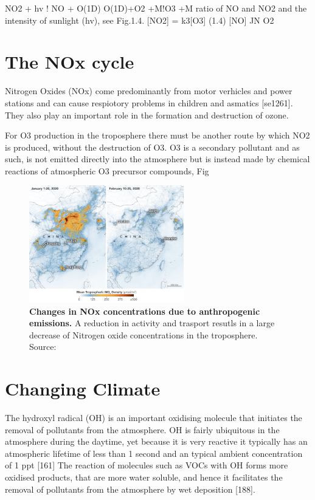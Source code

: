 NO2 + hv   ! NO + O(1D) O(1D)+O2 +M  !O3 +M
ratio of NO and NO2 and the intensity of sunlight (hv), see Fig.1.4.
[NO2] = k3[O3] (1.4)
[NO] JN O2

\section{The NOx cycle}
Nitrogen Oxides (NOx) come predominantly from motor verhicles and power stations and can cause respiotory problems in children and asmatics [se1261]. They also play an important role in the formation and destruction of ozone.



For O3 production in the troposphere there must be another route by which NO2 is produced, without the destruction of O3. O3 is a secondary pollutant and as such, is not emitted directly into the atmosphere but is instead made by chemical reactions of atmospheric O3 precursor compounds, Fig



\begin{figure}[H]
    \centering
    \includegraphics[width=0.6\textwidth]{china_trop_2020056.png}
    \caption{\textbf{Changes in NOx concentrations due to anthropogenic emissions.} A reduction in activity and trasport resutls in a large decrease of Nitrogen oxide concentrations in the troposphere. Source: \citep{chinanox}}
    \label{fig:chinanox}
\end{figure}


\section{Changing Climate}


The hydroxyl radical (OH) is an important oxidising molecule that initiates the removal of pollutants from the atmosphere. OH is fairly ubiquitous in the atmosphere during the daytime, yet because it is very reactive it typically has an atmospheric lifetime of less than 1 second and an typical ambient concentration of 1 ppt [161]
The reaction of molecules such as VOCs with OH forms more oxidised products, that are more water soluble, and hence it facilitates the removal of pollutants from the atmosphere by wet deposition [188].

